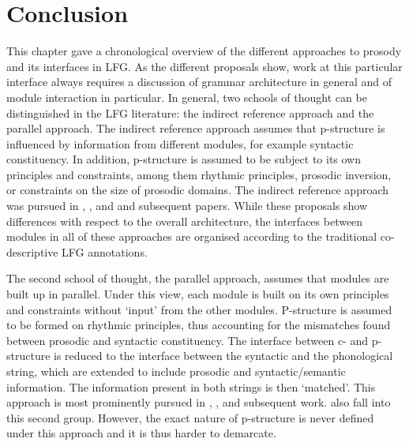 \documentclass[output=paper,hidelinks]{langscibook}
\begin{document}
\section{Conclusion}
\label{sec:Conclusion}
This chapter gave a chronological overview of the different approaches to prosody and its interfaces in LFG. 
As the different proposals show, work at this particular interface always requires a discussion of grammar architecture in general and of module interaction in particular. In general, two schools of thought can be distinguished in the LFG literature: the indirect reference approach and the parallel approach. The indirect reference approach assumes that p-structure is influenced by information from different modules, for example syntactic constituency. In addition, p-structure is assumed to be subject to its own principles and constraints, among them rhythmic principles, prosodic inversion, or constraints on the size of prosodic domains. The indirect reference approach was pursued in \citet{buttking98}, \citet{Oconnor2005}, and \citet{Boegel2015} and subsequent papers. While these proposals show differences with respect to the overall architecture, the interfaces between modules in all of these approaches are organised according to the traditional co-descriptive LFG annotations. 

The second school of thought, the parallel approach, assumes that modules are built up in parallel. Under this view,  each module is built on its own principles and constraints without `input' from the other modules. P-structure is assumed to be formed on rhythmic principles, thus accounting for the mismatches found between prosodic and syntactic constituency. The interface between c- and p-structure is reduced to the interface between the syntactic and the phonological string, which are extended to include prosodic and syntactic/semantic information. The information present in both strings is then `matched'. This approach is most prominently pursued in \citet{DM11}, \citet{MycockLowe2013}, and subsequent work. \citet{boegeletal09,boegel-etal2010} also fall into this second group. However, the exact nature of p-structure is never defined under this approach and it is thus harder to demarcate.
\end{document}
